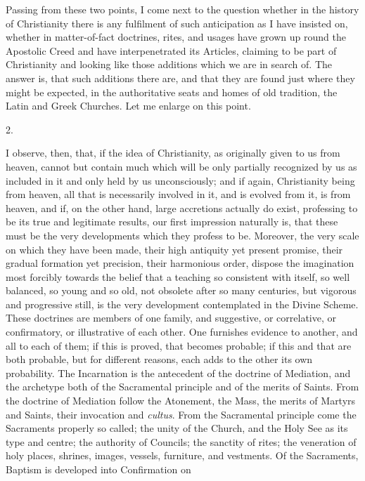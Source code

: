 Passing from these two points, I come next to the
question whether in the history of Christianity there is
any fulfilment of such anticipation as I have insisted
on, whether in matter-of-fact doctrines, rites, and
usages have grown up round the Apostolic Creed and have
interpenetrated its Articles, claiming to be part of
Christianity and looking like those additions which we
are in search of. The answer is, that such additions
there are, and that they are found just where they might
be expected, in the authoritative seats and homes of old
tradition, the Latin and Greek Churches. Let me enlarge
on this point.

2.

I observe, then, that, if the idea of Christianity, as
originally given to us from heaven, cannot but contain
much which will be only partially recognized by us as
included in it and only held by us unconsciously; and if
again, Christianity being from heaven, all that is
necessarily involved in it, and is evolved from it, is
from heaven, and if, on the other hand, large accretions
actually do exist, professing to be its true and
legitimate results, our first impression naturally is,
that these must be the very developments which they
profess to be. Moreover, the very scale on which they
have been made, their high antiquity yet present promise,
their gradual formation yet precision, their harmonious
order, dispose the imagination most forcibly towards the
belief that a teaching so consistent with itself, so well
balanced, so young and so old, not obsolete after so many
centuries, but vigorous and progressive still, is the
very development contemplated in the Divine Scheme. These
doctrines are members of one family, and suggestive, or
correlative, or confirmatory, or illustrative of each
other. One furnishes evidence to another, and all to each
of them; if this is proved, that becomes probable; if
this and that are both probable, but for different
reasons, each adds to the other its own probability. The
Incarnation is the antecedent of the doctrine of
Mediation, and the archetype both of the Sacramental principle and of the merits of Saints. From the doctrine
of Mediation follow the Atonement, the Mass, the merits
of Martyrs and Saints, their invocation and \emph{cultus}.
From the Sacramental principle come the Sacraments
properly so called; the unity of the Church, and the Holy
See as its type and centre; the authority of Councils;
the sanctity of rites; the veneration of holy places,
shrines, images, vessels, furniture, and vestments. Of
the Sacraments, Baptism is developed into Confirmation on
